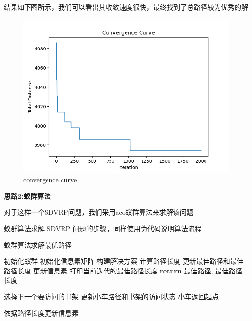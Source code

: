 \documentclass[withoutpreface,bwprint]{thesis-config}
\begin{document}
\par 结果如下图所示，我们可以看出其收敛速度很快，最终找到了总路径较为优秀的解
    \begin{figure}[!htbp]
        \centering
        \begin{minipage}[b]{0.8\linewidth}
            \centering
            \includegraphics[width=1\textwidth]{figures/result1.2.png}
            \caption{convergence curve}
        \end{minipage}
    \end{figure}

\newpage 

\par \textbf{思路2:蚁群算法}

对于这样一个SDVRP问题，我们采用aco蚁群算法来求解该问题
\par 蚁群算法求解 SDVRP 问题的步骤，同样使用伪代码说明算法流程
\begin{breakablealgorithm}
    \caption{蚁群算法求解最优路径}
    \begin{algorithmic}[1]
        \State 初始化蚁群
        \State 初始化信息素矩阵
                \State 构建解决方案
                \State 计算路径长度
                    \State 更新最佳路径和最佳路径长度
                \EndIf
            \EndFor
            \State 更新信息素
            \State 打印当前迭代的最佳路径长度
        \EndFor
        \State \textbf{return} 最佳路径, 最佳路径长度
        \EndFunction
        
                    \State 选择下一个要访问的书架
                    \State 更新小车路径和书架的访问状态
                \EndWhile
                \State 小车返回起点
            \EndFor
        \EndFunction
        
            \State 依据路径长度更新信息素
        \EndFunction
    \end{algorithmic}
\end{breakablealgorithm}
\end{document}
